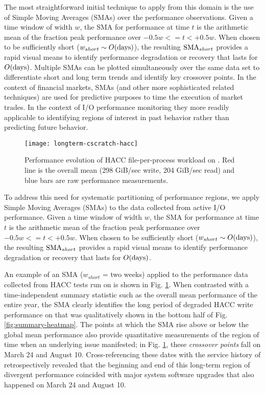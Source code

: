 The most straightforward initial technique to apply from this domain is
the use of Simple Moving Averages (SMAs) over the performance observations.
Given a time window of width $w$, the SMA for performance at time $t$ is the arithmetic mean of the fraction peak performance over ${-0.5w <= t < +0.5w}$.
When chosen to be sufficiently short (${w_{short} \sim O(\textup{days})}$),
the resulting $\textup{SMA}_{short}$ provides a rapid visual means to
identify performance degradation or recovery that lasts for
$O(\textup{days})$.  Multiple SMAs can be plotted simultaneously over the
same data set to differentiate short and long term trends and identify key
crossover points. In the context of financial markets, SMAs (and other more
sophisticated related techniques) are used for predictive purposes to time
the execution of market trades.  In the context of I/O performance
monitoring they more readily applicable to identifying regions of interest in past
behavior rather than predicting future behavior.

\begin{figure}[t]
    \centering
    \texttt{[image: longterm-cscratch-hacc]}
    \vspace{-.35in}
    \caption{Performance evolution of HACC file-per-process workload on \cori.  Red line is the overall mean (298 GiB/sec write, 204 GiB/sec read) and blue bars are raw performance measurements.}
    \label{fig:timeseries-baseline}
\end{figure}

To address this need for systematic partitioning of performance regions, we apply Simple Moving Averages (SMAs) to the data collected from active I/O performance.
Given a time window of width $w$, the SMA for performance at time $t$ is the arithmetic mean of the fraction peak performance over ${-0.5w <= t < +0.5w}$.
When chosen to be sufficiently short (${w_{short} \sim O(\textup{days})}$), the resulting $\textup{SMA}_{short}$ provides a rapid visual means to identify performance degradation or recovery that lasts for $O(\textup{days})$.

An example of an SMA ($w_{short}$ = two weeks) applied to the performance data collected from HACC tests run on \cori is shown in Fig. \ref{fig:timeseries-baseline}.
When contrasted with a time-independent summary statistic such as the overall mean performance of the entire year, the SMA clearly identifies the long period of degraded HACC write performance on \cori that was qualitatively shown in the bottom half of Fig. \ref{fig:summary-heatmap}.
The points at which the SMA rise above or below the global mean performance also provide quantitative measurements of the region of time when an underlying issue manifested;
in Fig. \ref{fig:timeseries-baseline}, these \emph{crossover points} fall on March 24 and August 10.
Cross-referencing these dates with the service history of \cori retrospectively revealed that the beginning and end of this long-term region of divergent performance coincided with major system software upgrades that also happened on March 24 and August 10.

